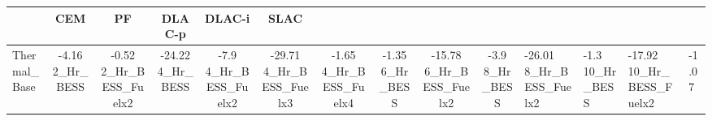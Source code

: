 \begin{tabular}{lccccccccc}
\toprule
 & CEM & PF & DLAC-p & DLAC-i & SLAC \\
\midrule
Thermal_Base & -4.16%
2_Hr_BESS & -0.52%
2_Hr_BESS_Fuelx2 & -24.22%
4_Hr_BESS & -7.9%
4_Hr_BESS_Fuelx2 & -29.71%
4_Hr_BESS_Fuelx3 & -1.65%
4_Hr_BESS_Fuelx4 & -1.35%
6_Hr_BESS & -15.78%
6_Hr_BESS_Fuelx2 & -3.9%
8_Hr_BESS & -26.01%
8_Hr_BESS_Fuelx2 & -1.3%
10_Hr_BESS & -17.92%
10_Hr_BESS_Fuelx2 & -1.07%
\bottomrule
\end{tabular}

